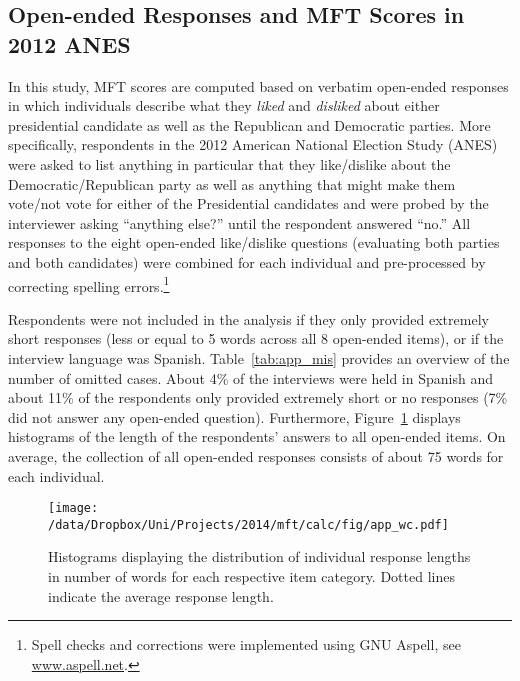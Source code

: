 \subsection{Open-ended Responses and MFT Scores in 2012 ANES}

In this study, MFT scores are computed based on verbatim open-ended responses in which individuals describe what they \textit{liked} and \textit{disliked} about either presidential candidate as well as the Republican and Democratic parties. More specifically, respondents in the 2012 American National Election Study (ANES) were asked to list anything in particular that they like/dislike about the Democratic/Republican party as well as anything that might make them vote/not vote for either of the Presidential candidates and were probed by the interviewer asking ``anything else?'' until the respondent answered ``no.'' All responses to the eight open-ended like/dislike questions (evaluating both parties and both candidates) were combined for each individual and pre-processed by correcting spelling errors.\footnote{Spell checks and corrections were implemented using GNU Aspell, see \url{www.aspell.net}.}



Respondents were not included in the analysis if they only provided extremely short responses (less or equal to 5 words across all 8 open-ended items), or if the interview language was Spanish. Table~\ref{tab:app_mis} provides an overview of the number of omitted cases. About 4\% of the interviews were held in Spanish and about 11\% of the respondents only provided extremely short or no responses (7\% did not answer any open-ended question). Furthermore, Figure~\ref{fig:appB2num} displays histograms of the length of the respondents' answers to all open-ended items. On average, the collection of all open-ended responses consists of about 75 words for each individual.

\begin{figure}[h]\centering
\texttt{[image: /data/Dropbox/Uni/Projects/2014/mft/calc/fig/app\_wc.pdf]}
\caption[Histograms displaying the distribution of individual response lengths in number of words for each respective item category]{Histograms displaying the distribution of individual response lengths in number of words for each respective item category. Dotted lines indicate the average response length.}\label{fig:appB2num}
\end{figure}


